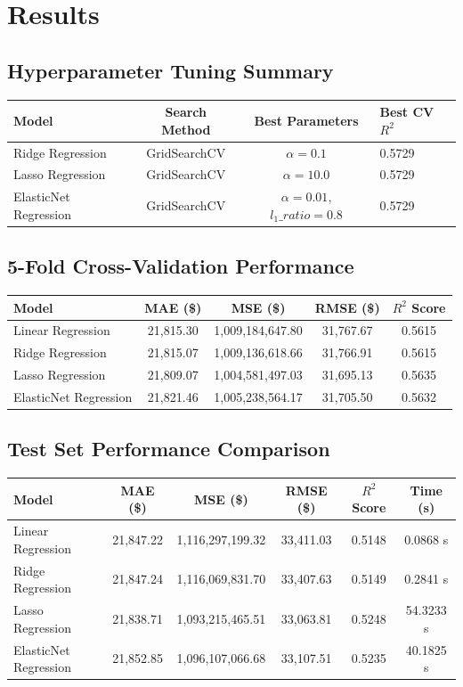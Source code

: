 \documentclass[12pt,a4paper]{article}
\begin{document}
\section{Results}

\subsection*{Hyperparameter Tuning Summary}
\begin{tabular}{lccs}
\toprule
Model & Search Method & Best Parameters & Best CV $R^2$ \\
\midrule
Ridge Regression & GridSearchCV & $\alpha = 0.1$ & 0.5729 \\
Lasso Regression & GridSearchCV & $\alpha = 10.0$ & 0.5729 \\
ElasticNet Regression & GridSearchCV & $\alpha = 0.01$, $l_1\_ratio = 0.8$ & 0.5729 \\
\bottomrule
\end{tabular}

\subsection*{5-Fold Cross-Validation Performance}
\begin{tabular}{lcccc}
\toprule
Model & MAE (\$) & MSE (\$) & RMSE (\$) & $R^2$ Score \\
\midrule
Linear Regression & 21,815.30 & 1,009,184,647.80 & 31,767.67 & 0.5615 \\
Ridge Regression & 21,815.07 & 1,009,136,618.66 & 31,766.91 & 0.5615 \\
Lasso Regression & 21,809.07 & 1,004,581,497.03 & 31,695.13 & 0.5635 \\
ElasticNet Regression & 21,821.46 & 1,005,238,564.17 & 31,705.50 & 0.5632 \\
\bottomrule
\end{tabular}

\subsection*{Test Set Performance Comparison}
\begin{tabular}{lccccc}
\toprule
Model & MAE (\$) & MSE (\$) & RMSE (\$) & $R^2$ Score & Time (s) \\
\midrule
Linear Regression & 21,847.22 & 1,116,297,199.32 & 33,411.03 & 0.5148 & 0.0868 s \\
Ridge Regression & 21,847.24 & 1,116,069,831.70 & 33,407.63 & 0.5149 & 0.2841 s \\
Lasso Regression & 21,838.71 & 1,093,215,465.51 & 33,063.81 & 0.5248 & 54.3233 s \\
ElasticNet Regression & 21,852.85 & 1,096,107,066.68 & 33,107.51 & 0.5235 & 40.1825 s \\
\bottomrule
\end{tabular}
\end{document}
